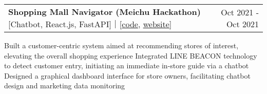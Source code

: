 \newcommand{\resumeProjEntry}[3]{
    \vspace{5pt}\item
      \begin{tabular*}{0.97\textwidth}{l@{\extracolsep{\fill}}r}
        \textbf{#1} #2 & \small #3\\
      \end{tabular*}\vspace{-5pt}
}


\resumeProjEntry
{Shopping Mall Navigator (Meichu Hackathon)}
{[Chatbot, React.js, FastAPI]｜[\href{https://github.com/OscarShiang/meichu-stack}{code}, \href{https://line-tv.kuouu.tw}{website}]}
{Oct 2021 - Oct 2021}
{
    \resumeItemListStart
        \resumeItem
        {Built a customer-centric system aimed at recommending stores of interest, elevating the overall shopping experience}
        \resumeItem
        {Integrated LINE BEACON technology to detect customer entry, initiating an immediate in-store guide via a chatbot}
        \resumeItem
        {Designed a graphical dashboard interface for store owners, facilitating chatbot design and marketing data monitoring}
    \resumeItemListEnd
}



